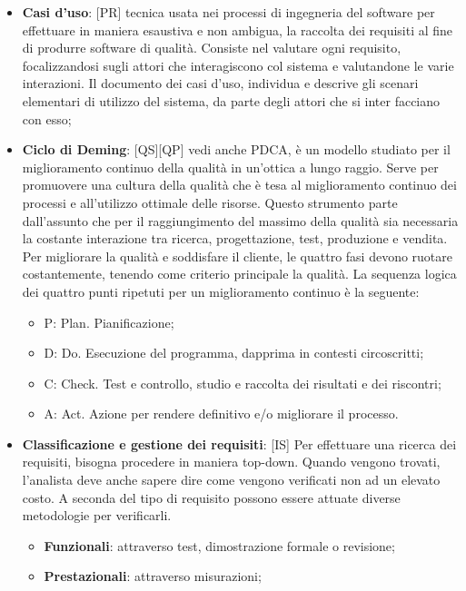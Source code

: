 	\begin{itemize}
		\item \textbf{Casi d'uso}: [PR] tecnica usata nei processi di ingegneria del software per effettuare in maniera esaustiva e non ambigua, la raccolta dei requisiti al fine di produrre software di qualità. Consiste nel valutare ogni requisito, focalizzandosi sugli attori che interagiscono col sistema e valutandone le varie interazioni. Il documento dei casi d’uso, individua e descrive gli scenari elementari di utilizzo del sistema, da parte degli attori che si inter facciano con esso;

		\item \textbf{Ciclo di Deming}: [QS][QP] vedi anche PDCA, è un modello studiato per il miglioramento continuo della qualità in un’ottica a lungo raggio. Serve per promuovere una cultura della qualità che è tesa al miglioramento continuo dei processi e all’utilizzo ottimale delle risorse. Questo strumento parte dall’assunto che per il raggiungimento del massimo della qualità sia necessaria la costante interazione tra ricerca, progettazione, test, produzione e vendita. \newline
	Per migliorare la qualità e soddisfare il cliente, le quattro fasi devono ruotare costantemente, tenendo come criterio principale la qualità.
	La sequenza logica dei quattro punti ripetuti per un miglioramento continuo è la seguente:
		\begin{itemize}
			\item P: Plan. Pianificazione;
			\item D: Do. Esecuzione del programma, dapprima in contesti circoscritti;
			\item C: Check. Test e controllo, studio e raccolta dei risultati e dei riscontri;
			\item A: Act. Azione per rendere definitivo e/o migliorare il processo.
		\end{itemize}
		\item \textbf{Classificazione e gestione dei requisiti}: [IS] Per effettuare una ricerca dei requisiti, bisogna procedere in maniera top-down. Quando vengono trovati, l'analista deve anche sapere dire come vengono verificati non ad un elevato costo. A seconda del tipo di requisito possono essere attuate diverse metodologie per verificarli.
			\begin{itemize}
				\item \textbf{Funzionali}: attraverso test, dimostrazione formale o revisione;
				\item \textbf{Prestazionali}: attraverso misurazioni;

\end{itemize}
\end{itemize}
